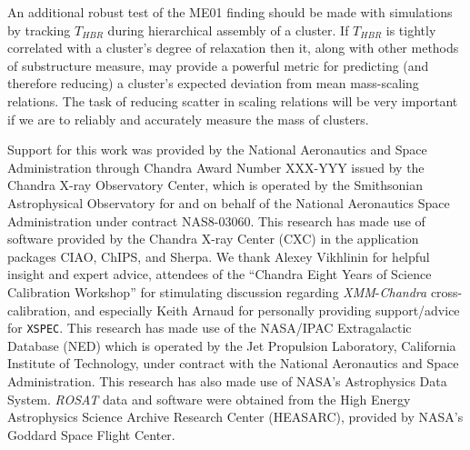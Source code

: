 \documentclass{emulateapj}
\begin{document}
An additional robust test of the ME01 finding should be made with
simulations by tracking $T_{HBR}$ during hierarchical assembly of a
cluster. If $T_{HBR}$ is tightly correlated with a cluster's degree of
relaxation then it, along with other methods of substructure measure,
may provide a powerful metric for predicting (and therefore reducing)
a cluster's expected deviation from mean mass-scaling relations. The
task of reducing scatter in scaling relations will be very important
if we are to reliably and accurately measure the mass of clusters.


\acknowledgements
Support for this work was provided by the National Aeronautics and
Space Administration through Chandra Award Number XXX-YYY issued by the
Chandra X-ray Observatory Center, which is operated by the Smithsonian
Astrophysical Observatory for and on behalf of the National
Aeronautics Space Administration under contract NAS8-03060. This
research has made use of software provided by the Chandra X-ray Center
(CXC) in the application packages CIAO, ChIPS, and Sherpa. We thank
Alexey Vikhlinin for helpful insight and expert advice, attendees of
the ``Chandra Eight Years of Science Calibration Workshop'' for
stimulating discussion regarding {\it XMM}-{\it Chandra}
cross-calibration, and especially Keith Arnaud for personally
providing support/advice for {\tt XSPEC}. This research has made use
of the NASA/IPAC Extragalactic Database (NED) which is operated by the
Jet Propulsion Laboratory, California Institute of Technology, under
contract with the National Aeronautics and Space Administration. This
research has also made use of NASA's Astrophysics Data System. {\it
ROSAT} data and software were obtained from the High Energy
Astrophysics Science Archive Research Center (HEASARC), provided by
NASA's Goddard Space Flight Center.








\clearpage
\LongTables



\clearpage






\clearpage



\clearpage


\end{document}
